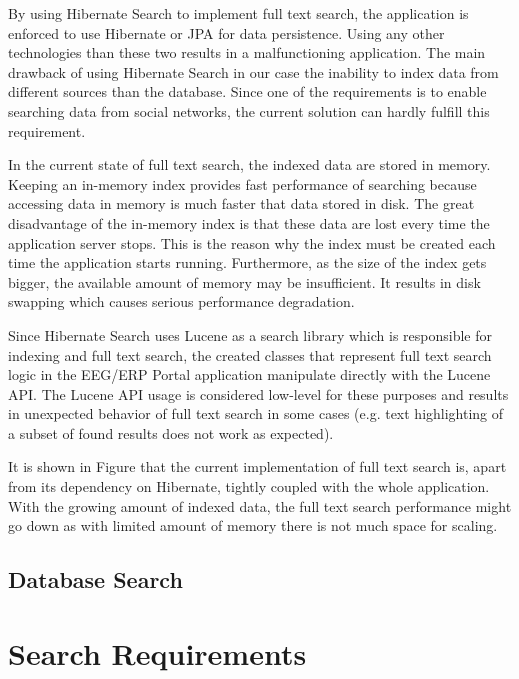\documentclass[12pt, oneside, a4paper]{book}
\begin{document}

By using Hibernate Search to implement full text search, the application is enforced to use Hibernate or JPA for data persistence.
Using any other technologies than these two results in a malfunctioning application.
The main drawback of using Hibernate Search in our case the inability to index data from different sources than the database. 
Since one of the requirements is to enable searching data from social networks, the current solution can hardly fulfill this requirement. 



In the current state of full text search, the indexed data are stored in memory. 
Keeping an in-memory index provides fast performance of searching because accessing data in memory is much faster that data stored in disk. 
The great disadvantage of the in-memory index is that these data are lost every time the application server stops.
This is the reason why the index must be created each time the application starts running.
Furthermore, as the size of the index gets bigger, the available amount of memory may be insufficient.
It results in disk swapping which causes serious performance degradation.

Since Hibernate Search uses Lucene as a search library which is responsible for indexing and full text search, the created classes that represent full text search logic in the EEG/ERP Portal application manipulate directly with the Lucene API.
The Lucene API usage is considered low-level for these purposes and results in unexpected behavior of full text search in some cases (e.g. text highlighting of a subset of found results does not work as expected).

It is shown in Figure that the current implementation of full text search is, apart from its dependency on Hibernate, tightly coupled with the whole application. 
With the growing amount of indexed data, the full text search performance might go down as with limited amount of memory there is not much space for scaling.


\subsection{Database Search}

\section{Search Requirements}
\end{document}
